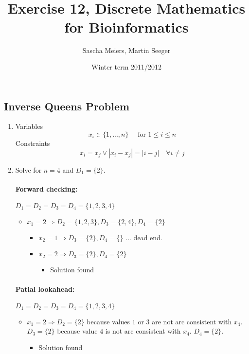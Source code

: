 \documentclass[a4paper, oneside]{scrartcl}
\author{Sascha Meiers, Martin Seeger}
\title{Exercise 12, Discrete Mathematics for Bioinformatics}
\date{Winter term 2011/2012}
\begin{document}
\maketitle


\subsection{Inverse Queens Problem}

\renewcommand{\labelenumi}{\alph{enumi})}
\begin{enumerate}
  \item 
  Variables
    \[x_i \in \{1,...,n\} \quad \text{ for } 1 \leq i \leq n \]
  Constraints
    \[ x_i = x_j  \vee |x_i -x_j| = |i-j| \quad  \forall i\neq j \]
    
  \item
  Solve for $n=4$ and $D_1 = \{2\}$.
  
  \paragraph{Forward checking:} $D_1 = D_2 = D_3 = D_4 = \{1,2,3,4\}$
  \begin{itemize} 
  \renewcommand{\labelitemi}{$\bullet$}
  \renewcommand{\labelitemii}{$\bullet$}
  \renewcommand{\labelitemiii}{$\bullet$}
  \renewcommand{\labelitemiv}{$\bullet$}
        \item $x_1 = 2 \Rightarrow D_2 = \{1,2,3\}, D_3 = \{2,4\}, D_4 = \{2\}$
        \begin{itemize}
            \item $x_2 = 1 \Rightarrow D_3 = \{2\}, D_4 = \{\}$ ... dead end.
            \item $x_2 = 2 \Rightarrow D_3 = \{2\}, D_4 = \{2\}$
            \begin{itemize}
                \item Solution found
            \end{itemize}
        \end{itemize}
  \end{itemize}
  

  \paragraph{Patial lookahead:} $D_1 = D_2 = D_3 = D_4 = \{1,2,3,4\}$
  \begin{itemize} 
  \renewcommand{\labelitemi}{$\bullet$}
  \renewcommand{\labelitemii}{$\bullet$}
  \renewcommand{\labelitemiii}{$\bullet$}
  \renewcommand{\labelitemiv}{$\bullet$}
        \item $x_1 = 2 \Rightarrow D_2 = \{2\}$ because values $1$ or $3$ are not arc consistent with $x_4$. 
              $D_3 = \{2\}$ because value $4$ is not arc consistent with $x_4$. $D_4 = \{2\}$.
        \begin{itemize}
            \item Solution found
        \end{itemize}
  \end{itemize}
    

\end{enumerate}
\end{document}
